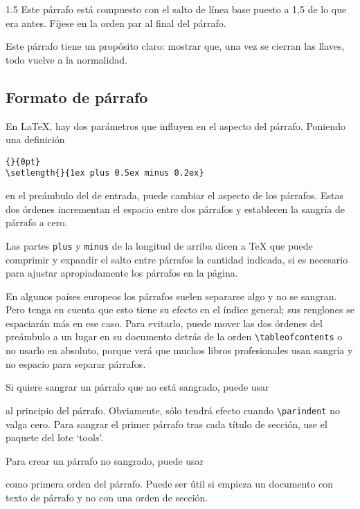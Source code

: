 \begin{example}
{\setlength{\baselineskip}%
           {1.5\baselineskip}
Este párrafo está compuesto con
el salto de línea base puesto a
1,5 de lo que era antes.  Fíjese
en la orden par al final del
párrafo.\par}

Este párrafo tiene un propósito
claro: mostrar que, una vez se
cierran las llaves, todo vuelve
a la normalidad.
\end{example}

\subsection{Formato de párrafo}\label{parsp}

En \LaTeX{}, hay dos parámetros que influyen en el aspecto del párrafo.  Poniendo una definición
\begin{code}
\verb|{|\verb|}{0pt}| \\
\verb|\setlength{|\verb|}{1ex plus 0.5ex minus 0.2ex}|
\end{code}
en el preámbulo del \filenomo{} de entrada, puede cambiar el aspecto de los párrafos.  Estas dos órdenes incrementan el espacio entre dos párrafos y establecen la sangría de párrafo a cero.

Las partes \texttt{plus} y \texttt{minus} de la longitud de arriba dicen a \TeX{} que puede comprimir y expandir el salto entre párrafos la cantidad indicada, si es necesario para ajustar apropiadamente los párrafos en la página.

En algunos países europeos los párrafos suelen separarse algo y no se sangran.  Pero tenga en cuenta que esto tiene su efecto en el índice general; sus renglones se espaciarán más en ese caso.  Para evitarlo, puede mover las dos órdenes del preámbulo a un lugar en su documento detrás de la orden \verb|\tableofcontents| o no usarlo en absoluto, porque verá que muchos libros profesionales usan sangría y no espacio para separar párrafos.

Si quiere sangrar un párrafo que no está sangrado, puede usar
\begin{lscommand}
\end{lscommand}
al principio del párrafo. Obviamente,  sólo tendrá efecto cuando \verb|\parindent| no valga cero. Para sangrar el primer párrafo tras cada título de sección, use el paquete  del lote `tools'.

Para crear un párrafo no sangrado, puede usar
\begin{lscommand}
\end{lscommand}
como primera orden del párrafo.  Puede ser útil si empieza un documento con texto de párrafo y no con una orden de sección.

